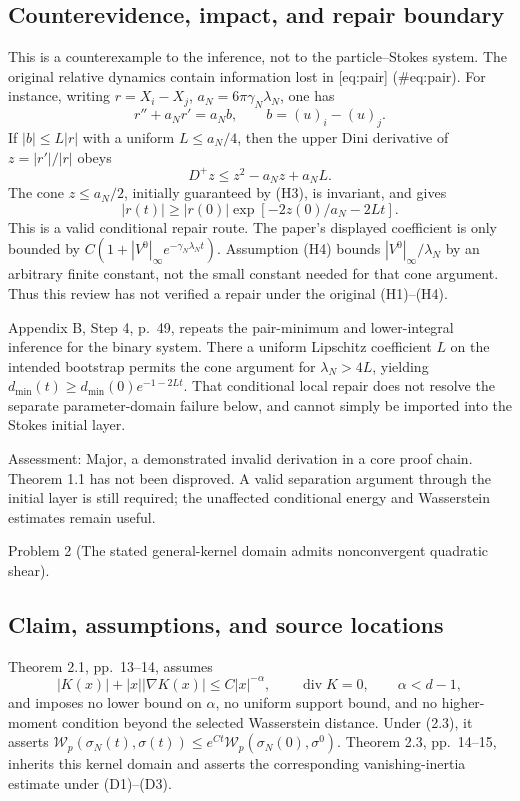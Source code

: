 \documentclass[10pt]{article}
\begin{document}
\subsection*{Counterevidence, impact, and repair boundary}
This is a counterexample to the inference, not to the particle–Stokes system. The original relative dynamics contain information lost in [eq:pair] (\#eq:pair). For instance, writing \(r=X_i-X_j\), \(a_N=6\pi\gamma_N\lambda_N\), one has \[r''+a_Nr'=a_N b,\qquad b=(u)_i-(u)_j.\] If \(|b|\le L|r|\) with a uniform \(L\le a_N/4\), then the upper Dini derivative of \(z=|r'|/|r|\) obeys \[D^+z\le z^2-a_Nz+a_NL.\] The cone \(z\le a_N/2\), initially guaranteed by (H3), is invariant, and gives \[|r(t)|\ge |r(0)|\exp[-2z(0)/a_N-2Lt].\] This is a valid conditional repair route. The paper’s displayed coefficient is only bounded by \(C(1+|V^0|_\infty e^{-\gamma_N\lambda_Nt})\). Assumption (H4) bounds \(|V^0|_\infty/\lambda_N\) by an arbitrary finite constant, not the small constant needed for that cone argument. Thus this review has not verified a repair under the original (H1)–(H4).\par
Appendix B, Step 4, p. 49, repeats the pair-minimum and lower-integral inference for the binary system. There a uniform Lipschitz coefficient \(L\) on the intended bootstrap permits the cone argument for \(\lambda_N>4L\), yielding \(d_{\min}(t)\ge d_{\min}(0)e^{-1-2Lt}\). That conditional local repair does not resolve the separate parameter-domain failure below, and cannot simply be imported into the Stokes initial layer.\par
Assessment: Major, a demonstrated invalid derivation in a core proof chain. Theorem 1.1 has not been disproved. A valid separation argument through the initial layer is still required; the unaffected conditional energy and Wasserstein estimates remain useful.\par
Problem 2 (The stated general-kernel domain admits nonconvergent quadratic shear).\par
\subsection*{Claim, assumptions, and source locations}
Theorem 2.1, pp. 13–14, assumes \[|K(x)|+|x||\nabla K(x)|\le C|x|^{-\alpha},\qquad
 \operatorname{div}K=0,\qquad \alpha<d-1,\] and imposes no lower bound on \(\alpha\), no uniform support bound, and no higher-moment condition beyond the selected Wasserstein distance. Under (2.3), it asserts \(\mathcal W_p(\sigma_N(t),\sigma(t))\le e^{Ct}\mathcal W_p(\sigma_N(0),\sigma^0)\). Theorem 2.3, pp. 14–15, inherits this kernel domain and asserts the corresponding vanishing-inertia estimate under (D1)–(D3).\par
\end{document}
